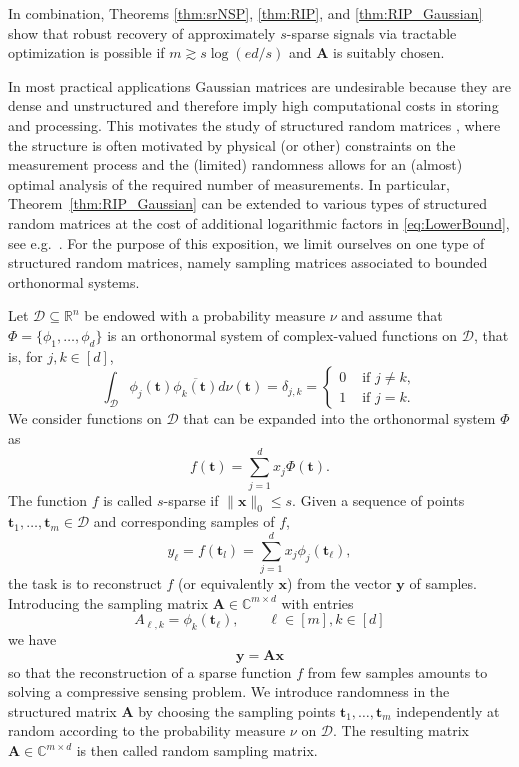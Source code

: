 \documentclass{svproc}
\newcommand{\bA}{\boldsymbol{A}}
\newcommand{\bt}{\boldsymbol{t}}
\newcommand{\bx}{\boldsymbol{x}}
\newcommand{\by}{\boldsymbol{y}}
\newcommand{\0}{\boldsymbol{0}}
\newcommand{\1}{\boldsymbol{1}}
\newcommand{\calD}{\mathcal{D}}
\renewcommand{\subset}{\subseteq}
\def\C{\mathbb{C}}
\def\calD{\mathcal{D}}
\def\R{\mathbb{R}}
\begin{document}
In combination, Theorems \ref{thm:srNSP}, \ref{thm:RIP}, and \ref{thm:RIP_Gaussian} show that robust recovery of approximately $s$-sparse signals via tractable optimization is possible if $m \gtrsim s \log(ed/s)$ and $\bA$ is suitably chosen. 

In most practical applications Gaussian matrices are undesirable because they are dense and unstructured and therefore imply high computational costs in storing and processing. This motivates the study of structured random matrices \cite{ra10}, where the structure is often motivated by physical (or other) constraints on the measurement process and the (limited) randomness allows for an (almost) optimal analysis of the required number of measurements.
In particular, Theorem~\ref{thm:RIP_Gaussian} can be extended to various types of structured random matrices at the cost of additional logarithmic factors in \eqref{eq:LowerBound}, see e.g.\ \cite{cata06,dora17,ra10,krmera14,ro09}.
For the purpose of this exposition, we limit ourselves on one type of structured random matrices, namely sampling matrices associated to bounded orthonormal systems.

Let $\calD \subset \R^n$ be endowed with a probability measure $\nu$ and assume that 
$\Phi = \{\phi_1,\hdots,\phi_d\}$ is an orthonormal system of complex-valued 
functions on $\calD$, that is, for $j,k \in [d]$,
\begin{equation}\label{def:orthonormality}
\int_{\calD} \phi_j(\bt) \overline{\phi_k(\bt)} d\nu(\bt) = \delta_{j,k} = \left\{ \begin{array}{cl} 0 & \mbox{ if } j \neq k,\\
1 & \mbox{ if } j= k.  
\end{array}
\right.
\end{equation}
We consider functions on $\calD$ that can be expanded into the orthonormal system $\Phi$ as
\[
f(\bt) = \sum_{j=1}^d x_j \Phi(\bt).
\]
The function $f$ is called $s$-sparse if $\|\bx\|_0 \leq s$. Given a sequence of points $\bt_1, \hdots, \bt_m \in \calD$ and corresponding samples of $f$,
\[
y_\ell = f(\bt_l) = \sum_{j=1}^d x_j \phi_j(\bt_\ell), %
\]
the task is to reconstruct $f$ (or equivalently $\bx$) from the vector $\by$ of samples. Introducing the sampling matrix 
$\bA \in \C^{m \times d}$ with entries
\begin{equation}\label{A:sample}
    A_{\ell,k} = %
    \phi_k(\bt_\ell), \qquad \ell \in [m], k \in [d]
\end{equation}
we have
\[
\by = \bA \bx
\]
so that the reconstruction of a sparse function $f$ from few samples amounts to solving a compressive sensing problem.
We introduce randomness in the structured matrix $\bA$ by choosing the sampling points $\bt_1,\hdots,\bt_m$ independently at random according to the probability measure $\nu$ on $\calD$. The resulting matrix $\bA \in \C^{m \times d}$ is then called random sampling matrix.
\end{document}
